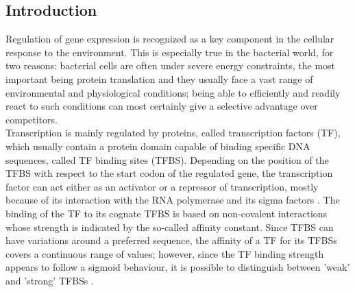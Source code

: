 \subsection{Introduction}
Regulation of gene expression is recognized as a key component in the cellular response to the environment. This is especially true in the bacterial world, for two reasons: bacterial cells are often under severe energy constraints, the most important being protein translation \cite{depardieu2007modes} and they usually face a vast range of environmental and physiological conditions; being able to efficiently and readily react to such conditions can most certainly give a selective advantage over competitors.\\
Transcription is mainly regulated by proteins, called transcription factors (TF), which usually contain a protein domain capable of binding specific DNA sequences, called TF binding sites (TFBS). Depending on the position of the TFBS with respect to the start codon of the regulated gene, the transcription factor can act either as an activator or a repressor of transcription, mostly because of its interaction with the RNA polymerase and its sigma factors \cite{gruber2003multiple, van2009mechanisms}. The binding of the TF to its cognate TFBS is based on non-covalent interactions whose strength is indicated by the so-called affinity constant. Since TFBS can have variations around a preferred sequence, the affinity of a TF for its TFBSs covers a continuous range of values; however, since the TF binding strength appears to follow a sigmoid behaviour, it is possible to distinguish between 'weak' and 'strong' TFBSs \cite{lassig2007biophysics}.\\
